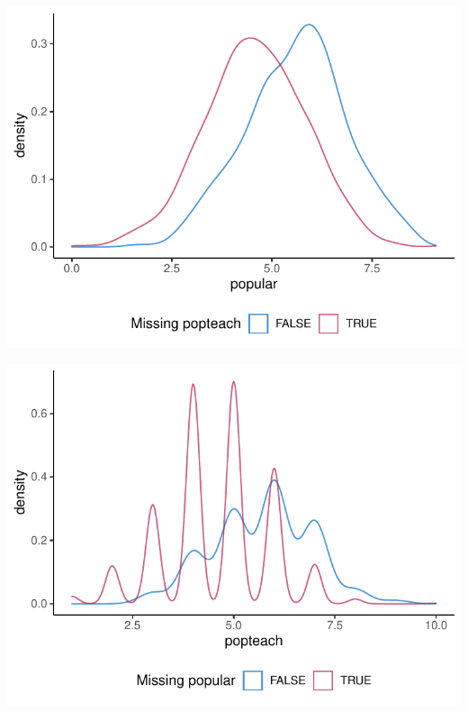 \documentclass[
]{jss}
\begin{document}
\begin{CodeChunk}


\begin{center}\includegraphics{Manuscript_files/figure-latex/pop_dist-1} \end{center}



\begin{center}\includegraphics{Manuscript_files/figure-latex/pop_dist-2} \end{center}

\end{CodeChunk}
\end{document}
